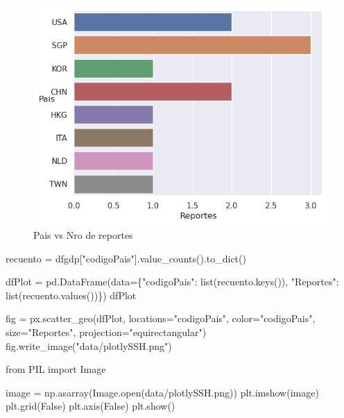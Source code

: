 \documentclass[
  letterpaper,
  DIV=11,
  numbers=noendperiod]{scrartcl}
\newenvironment{Shaded}{\begin{snugshade}}{\end{snugshade}}
\newcommand{\BuiltInTok}[1]{\textcolor[rgb]{0.00,0.23,0.31}{#1}}
\newcommand{\ImportTok}[1]{\textcolor[rgb]{0.00,0.46,0.62}{#1}}
\newcommand{\NormalTok}[1]{\textcolor[rgb]{0.00,0.23,0.31}{#1}}
\newcommand{\OperatorTok}[1]{\textcolor[rgb]{0.37,0.37,0.37}{#1}}
\newcommand{\StringTok}[1]{\textcolor[rgb]{0.13,0.47,0.30}{#1}}
\newcommand{\VariableTok}[1]{\textcolor[rgb]{0.07,0.07,0.07}{#1}}
\begin{document}
\begin{figure}[H]

{\centering \includegraphics{Análisis_files/figure-pdf/fig-countplot-output-1.png}

}

\caption{\label{fig-countplot}Pais vs Nro de reportes}

\end{figure}

\begin{Shaded}
\begin{Highlighting}[]
\NormalTok{recuento }\OperatorTok{=}\NormalTok{ dfgdp[}\StringTok{"codigoPais"}\NormalTok{].value\_counts().to\_dict()}

\NormalTok{dfPlot }\OperatorTok{=}\NormalTok{ pd.DataFrame(data}\OperatorTok{=}\NormalTok{\{}\StringTok{"codigoPais"}\NormalTok{: }\BuiltInTok{list}\NormalTok{(recuento.keys()), }\StringTok{"Reportes"}\NormalTok{: }\BuiltInTok{list}\NormalTok{(recuento.values())\})}
\NormalTok{dfPlot}

\NormalTok{fig }\OperatorTok{=}\NormalTok{ px.scatter\_geo(dfPlot, locations}\OperatorTok{=}\StringTok{"codigoPais"}\NormalTok{, color}\OperatorTok{=}\StringTok{"codigoPais"}\NormalTok{, size}\OperatorTok{=}\StringTok{"Reportes"}\NormalTok{,}
\NormalTok{                     projection}\OperatorTok{=}\StringTok{"equirectangular"}\NormalTok{)}
\NormalTok{fig.write\_image(}\StringTok{"data/plotlySSH.png"}\NormalTok{)}
\end{Highlighting}
\end{Shaded}

\begin{Shaded}
\begin{Highlighting}[]
\ImportTok{from}\NormalTok{ PIL }\ImportTok{import}\NormalTok{ Image }

\NormalTok{image }\OperatorTok{=}\NormalTok{ np.asarray(Image.}\BuiltInTok{open}\NormalTok{(}\StringTok{\textquotesingle{}data/plotlySSH.png\textquotesingle{}}\NormalTok{))}
\NormalTok{plt.imshow(image)}
\NormalTok{plt.grid(}\VariableTok{False}\NormalTok{)}
\NormalTok{plt.axis(}\VariableTok{False}\NormalTok{)}
\NormalTok{plt.show()}
\end{Highlighting}
\end{Shaded}
\end{document}
